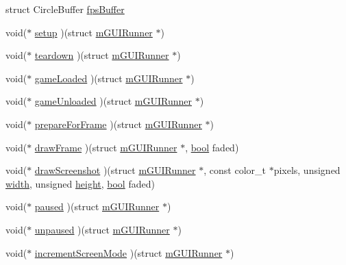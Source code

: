 \begin{DoxyCompactItemize}
\item 
struct Circle\+Buffer \mbox{\hyperlink{structm_g_u_i_runner_acf90aa75c0f883cd92a625fab75550eb}{fps\+Buffer}}
\item 
void($\ast$ \mbox{\hyperlink{structm_g_u_i_runner_a3fa270ca51a24bd2ce4ee9333b3d04fb}{setup}} )(struct \mbox{\hyperlink{structm_g_u_i_runner}{m\+G\+U\+I\+Runner}} $\ast$)
\item 
void($\ast$ \mbox{\hyperlink{structm_g_u_i_runner_a72eaad589dcd9fc9e2ea04081a874500}{teardown}} )(struct \mbox{\hyperlink{structm_g_u_i_runner}{m\+G\+U\+I\+Runner}} $\ast$)
\item 
void($\ast$ \mbox{\hyperlink{structm_g_u_i_runner_a4cb42f35a358fed8feb6b343299e3c7a}{game\+Loaded}} )(struct \mbox{\hyperlink{structm_g_u_i_runner}{m\+G\+U\+I\+Runner}} $\ast$)
\item 
void($\ast$ \mbox{\hyperlink{structm_g_u_i_runner_aa40d49395dff47f3cb5f45e1c25d8bb8}{game\+Unloaded}} )(struct \mbox{\hyperlink{structm_g_u_i_runner}{m\+G\+U\+I\+Runner}} $\ast$)
\item 
void($\ast$ \mbox{\hyperlink{structm_g_u_i_runner_a2c5e7031c72af3aca18b227b3e122011}{prepare\+For\+Frame}} )(struct \mbox{\hyperlink{structm_g_u_i_runner}{m\+G\+U\+I\+Runner}} $\ast$)
\item 
void($\ast$ \mbox{\hyperlink{structm_g_u_i_runner_ac00ed9083a5a5b5c11393fd0d449f0a5}{draw\+Frame}} )(struct \mbox{\hyperlink{structm_g_u_i_runner}{m\+G\+U\+I\+Runner}} $\ast$, \mbox{\hyperlink{libretro_8h_a4a26dcae73fb7e1528214a068aca317e}{bool}} faded)
\item 
void($\ast$ \mbox{\hyperlink{structm_g_u_i_runner_a5b42f516b067c480179a29398b15739d}{draw\+Screenshot}} )(struct \mbox{\hyperlink{structm_g_u_i_runner}{m\+G\+U\+I\+Runner}} $\ast$, const color\+\_\+t $\ast$pixels, unsigned \mbox{\hyperlink{readppm_8c_a59b7c57bf1dc7c36ac7c8232cf5bb713}{width}}, unsigned \mbox{\hyperlink{readppm_8c_ac8b624a7354198da45f5797b93b883c9}{height}}, \mbox{\hyperlink{libretro_8h_a4a26dcae73fb7e1528214a068aca317e}{bool}} faded)
\item 
void($\ast$ \mbox{\hyperlink{structm_g_u_i_runner_a45768f2d981f887c1f2a79c4f28cae5a}{paused}} )(struct \mbox{\hyperlink{structm_g_u_i_runner}{m\+G\+U\+I\+Runner}} $\ast$)
\item 
void($\ast$ \mbox{\hyperlink{structm_g_u_i_runner_a55bf92d832d54484a639ba183afb3131}{unpaused}} )(struct \mbox{\hyperlink{structm_g_u_i_runner}{m\+G\+U\+I\+Runner}} $\ast$)
\item 
void($\ast$ \mbox{\hyperlink{structm_g_u_i_runner_ac729aa9558cc95608e313b4e556c704f}{increment\+Screen\+Mode}} )(struct \mbox{\hyperlink{structm_g_u_i_runner}{m\+G\+U\+I\+Runner}} $\ast$)

\end{DoxyCompactItemize}
